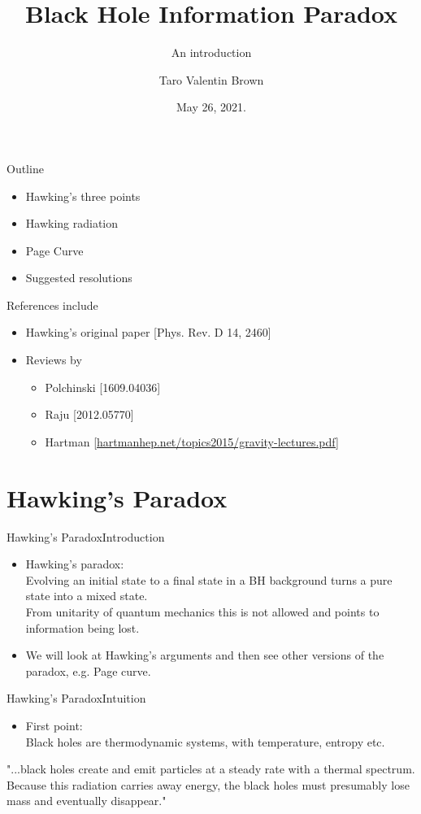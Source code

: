 \documentclass{beamer}[10]
\title{Black Hole Information Paradox}
\subtitle{An introduction}
\author{Taro Valentin Brown}
\institute{University of California, Davis}
\date{May 26, 2021.}
\begin{document}
\frame{\titlepage \vspace{-0.5cm}
}

\begin{frame}{Outline}{}
	\begin{itemize}
		\item Hawking's three points
		\item Hawking radiation
		\item Page Curve
		\item Suggested resolutions
	\end{itemize}
\vspace*{0.5cm}
References include
	\begin{itemize}
	\item Hawking's original paper [Phys. Rev. D 14, 2460]
	\item Reviews by 
	\begin{itemize}
		\item Polchinski [1609.04036]
		\item Raju [2012.05770]
		\item Hartman [\url{hartmanhep.net/topics2015/gravity-lectures.pdf}]
	\end{itemize}
\end{itemize}
\end{frame}
\section{Hawking's Paradox}
\begin{frame}{Hawking's Paradox}{Introduction}
	\begin{itemize}
		\item Hawking's paradox: 
		\\
		Evolving an initial state to a final state in a BH background turns a pure state into a mixed state. 
		\\
		From unitarity of quantum mechanics this is not allowed and points to information being lost. 
		\item We will look at Hawking's arguments and then see other versions of the paradox, e.g. Page curve.
	\end{itemize}
\end{frame}

\begin{frame}{Hawking's Paradox}{Intuition}
	\begin{itemize}
		\item First point:\\
		 Black holes are thermodynamic systems, with temperature, entropy etc. 
	\end{itemize}
"...black holes create and emit particles at a steady rate with a thermal spectrum. Because this radiation carries away energy, the black holes must presumably lose mass and eventually disappear."
\end{frame}
\end{document}
